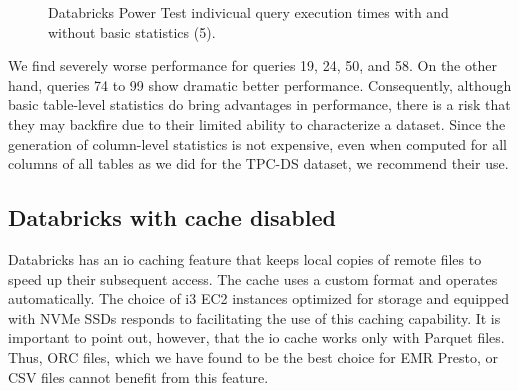 \begin{figure}
   \begin{center}
   \end{center}
   \caption{Databricks Power Test indivicual query execution times with and without basic statistics (5).}
   \label{fig:additionalResultsDatabricksWithBasicStatsPowerTestIndividualQueries5}
\end{figure}

We find severely worse performance for queries 19, 24, 50, and 58. On the other hand, queries 74 to 99 show dramatic better performance. Consequently, although basic table-level statistics do bring advantages in performance, there is a risk that they may backfire due to their limited ability to characterize a dataset. Since the generation of column-level statistics is not expensive, even when computed for all columns of all tables as we did for the TPC-DS dataset, we recommend their use.

\subsection{Databricks with cache disabled}

Databricks has an io caching feature that keeps local copies of remote files to speed up their subsequent access. The cache uses a custom format and operates automatically. The choice of i3 EC2 instances optimized for storage and equipped with NVMe SSDs responds to facilitating the use of this caching capability. It is important to point out, however, that the io cache works only with Parquet files. Thus, ORC files, which we have found to be the best choice for EMR Presto, or CSV files cannot benefit from this feature.

